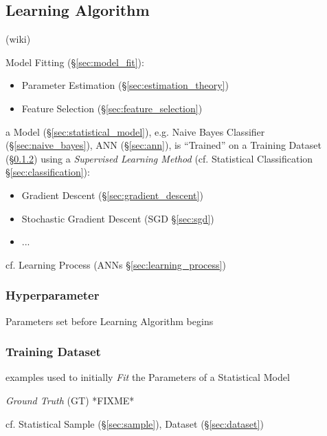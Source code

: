 \subsection{Learning Algorithm}\label{sec:learning_algorithm}

(wiki)

Model Fitting (\S\ref{sec:model_fit}):
\begin{itemize}
  \item Parameter Estimation (\S\ref{sec:estimation_theory})
  \item Feature Selection (\S\ref{sec:feature_selection})
\end{itemize}

a Model (\S\ref{sec:statistical_model}), e.g. Naive Bayes Classifier
(\S\ref{sec:naive_bayes}), ANN (\S\ref{sec:ann}), is ``Trained'' on a Training
Dataset (\S\ref{sec:training_dataset}) using a \emph{Supervised Learning Method}
(cf. Statistical Classification \S\ref{sec:classification}):
\begin{itemize}
  \item Gradient Descent (\S\ref{sec:gradient_descent})
  \item Stochastic Gradient Descent (SGD \S\ref{sec:sgd})
  \item ...
\end{itemize}

\fist cf. Learning Process (ANNs \S\ref{sec:learning_process})



\subsubsection{Hyperparameter}\label{sec:hyperparameter}

Parameters set before Learning Algorithm begins



\subsubsection{Training Dataset}\label{sec:training_dataset}

examples used to initially \emph{Fit} the Parameters of a Statistical Model

\emph{Ground Truth} (GT) *FIXME*

cf. Statistical Sample (\S\ref{sec:sample}), Dataset (\S\ref{sec:dataset})



